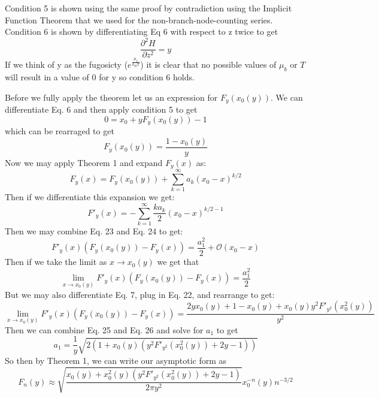 \documentclass{article}
\begin{document}
Condition 5 is shown using the same proof by contradiction using the Implicit Function Theorem that we used for the non-branch-node-counting series. Condition 6 is shown by differentiating Eq 6 with respect to z twice to get
\begin{equation}
\frac{\partial^2 H}{\partial z^2}=y
\end{equation}
If we think of y as the fugosicty (\(e^\frac{\mu_b}{k_BT}\)) it is clear that no possible values of \(\mu_b\) or \(T\) will result in a value of 0 for y so condition 6 holds.

Before we fully apply the theorem let us an expression for \(F_y(x_0(y))\). We can differentiate Eq. 6 and then apply condition 5 to get
\begin{equation}
0=x_0+yF_y(x_0(y))-1
\end{equation}
which can be rearraged to get
\begin{equation}
F_y(x_0(y))=\frac{1-x_0(y)}{y}
\end{equation}
Now we may apply Theorem 1 and expand \(F_y(x)\) as:
\begin{equation}
F_y(x)=F_y(x_0(y))+\sum_{k=1}^\infty a_k(x_0-x)^{k/2}
\end{equation}
Then if we differentiate this expansion we get:
\begin{equation}
F'_y(x)=-\sum_{k=1}^\infty \frac{ka_k}{2}(x_0-x)^{k/2-1}
\end{equation}
Then we may combine Eq. 23 and Eq. 24 to get:
\[F'_y(x)(F_y(x_0(y))-F_y(x))=\frac{a_1^2}{2}+\mathscr{O}(x_0-x)\]
Then if we take the limit as \(x \to x_0(y)\) we get that 
\begin{equation}
\lim_{x \to x_0(y)}F'_y(x)(F_y(x_0(y))-F_y(x))=\frac{a_1^2}{2}
\end{equation}
But we may also differentiate Eq. 7, plug in Eq. 22, and rearrange to get:
\begin{equation}
\lim_{x \to x_0(y)}F'_y(x)(F_y(x_0(y))-F_y(x))=\frac{2yx_0(y)+1-x_0(y)+x_0(y)y^2F'_{y^2}(x_0^2(y))}{y^2}
\end{equation}
Then we can combine Eq. 25 and Eq. 26 and solve for \(a_1\) to get
\begin{equation}
a_1=\frac{1}{y}\sqrt{2(1+x_0(y)(y^2F'_{y^2}(x_0^2(y))+2y-1))}
\end{equation}
So then by Theorem 1, we can write our asymptotic form as 
\begin{equation}
F_n(y) \approx \sqrt{\frac{x_0(y)+x_0^2(y)(y^2F'_{y^2}(x_0^2(y))+2y-1)}{2\pi y^2}} x_0^{-n}(y)n^{-3/2}
\end{equation}
\end{document}

